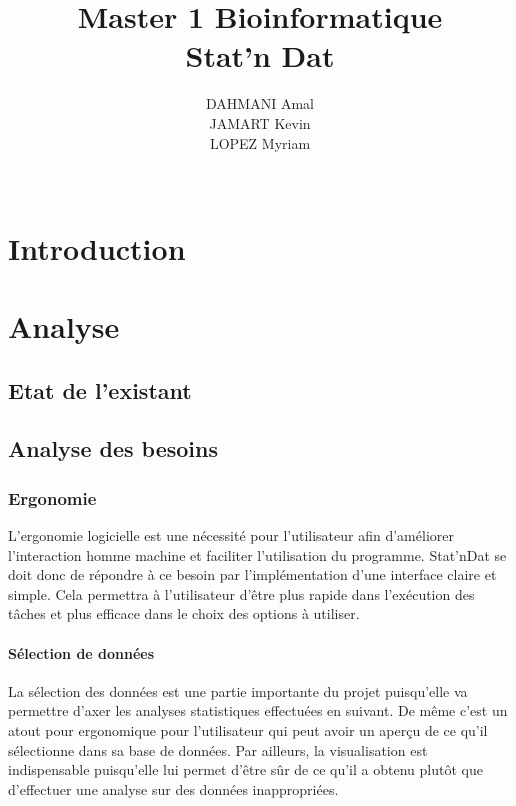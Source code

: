 \documentclass[a4paper,10pt]{report}
\title{Master 1 Bioinformatique\\Stat'n Dat}
\author{DAHMANI Amal\\JAMART Kevin\\LOPEZ Myriam\\\\}
\begin{document}
\renewcommand{\contentsname}{Sommaire}


\maketitle
\newpage
\tableofcontents
{}
\setcounter{tocdepth}{3}     %
\setcounter{secnumdepth}{3}  %


\newpage
\thispagestyle{empty}
\setcounter{page}{1}

\chapter*{Introduction}


 
\chapter{Analyse}


\section{Etat de l'existant}

\section{Analyse des besoins}


\subsection{Ergonomie}

L’ergonomie logicielle est une nécessité pour l’utilisateur afin d’améliorer l’interaction homme machine et faciliter l’utilisation du programme. Stat’nDat se doit donc de répondre à ce besoin par l’implémentation d’une interface claire et simple. Cela permettra à l’utilisateur d’être plus rapide dans l’exécution des tâches et plus efficace dans le choix des options à utiliser. 

\subsubsection{Sélection de données}

La sélection des données est une partie importante du projet puisqu’elle va permettre d’axer les analyses statistiques effectuées en suivant. De même c’est un atout pour ergonomique pour l’utilisateur qui peut avoir un aperçu de ce qu’il sélectionne dans sa base de données. Par ailleurs, la visualisation est indispensable puisqu’elle lui permet d’être sûr de ce qu’il a obtenu plutôt que d’effectuer une analyse sur des données inappropriées. \\
\end{document}
